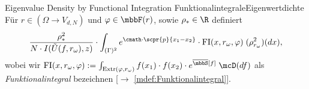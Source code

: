 \begin{mpos}{Eigenvalue Density by Functional Integration}
    {FunktionalintegraleEigenwertdichte}
    Für $r\in(\Omega\to V_{d,N})$ und $\varphi\in\mbbF(r)$, sowie $\rho_*\in\R$ definiert 
    \[
        \frac{\rho_{*}^2}{N\cdot I(\tilde U(f,r_\omega),z)}\cdot\int_{(\Gamma)^2}e^{\cmath\cdot\scpr{p}{x_1-x_2}}\cdot\text{FI}(x,r_\omega,\varphi)\;(\rho_{r_\omega}^2)(dx),
    \]
    wobei wir $\text{FI}(x,r_\omega,\varphi) := \int_{\text{Extr}(\varphi,r_\omega)}f(x_1)\cdot f(x_2)\cdot e^{\overline{\mbbS}[f]}\;\mcD(df)$ als \emph{Funktionalintegral} bezeichnen [$\to$ \ref{mdef:Funktionalintegral}].
\end{mpos}